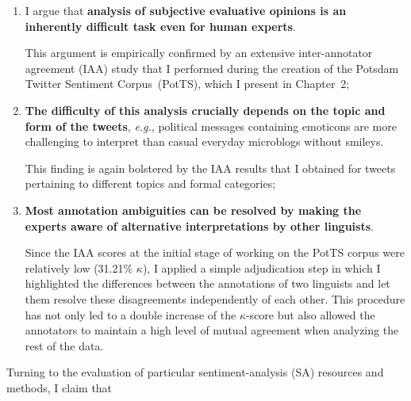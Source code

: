 \documentclass[11pt]{article}
\newcommand{\eg}{\textit{e.g.},}
\begin{document}
\begin{enumerate}
  \item I argue that \textbf{analysis of subjective evaluative
    opinions is an inherently difficult task even for human experts}.

    This argument is empirically confirmed by an extensive
    inter-annotator agreement (IAA) study that I performed during the
    creation of the Potsdam Twitter Sentiment Corpus~(PotTS), which I
    present in Chapter~2;

  \item\textbf{The difficulty of this analysis crucially depends on
    the topic and form of the tweets}, \eg{} political messages
    containing emoticons are more challenging to interpret than casual
    everyday microblogs without smileys.

    This finding is again bolstered by the IAA results that I obtained
    for tweets pertaining to different topics and formal categories;

  \item\textbf{Most annotation ambiguities can be resolved by making
    the experts aware of alternative interpretations by other
    linguists}.

    Since the IAA scores at the initial stage of working on the PotTS
    corpus were relatively low (31.21\% $\kappa$), I applied a simple
    adjudication step in which I highlighted the differences between
    the annotations of two linguists and let them resolve these
    disagreements independently of each other.  This procedure has not
    only led to a double increase of the $\kappa$-score but also
    allowed the annotators to maintain a high level of mutual
    agreement when analyzing the rest of the data.
\end{enumerate}
Turning to the evaluation of particular sentiment-analysis (SA)
resources and methods, I claim that
\end{document}
